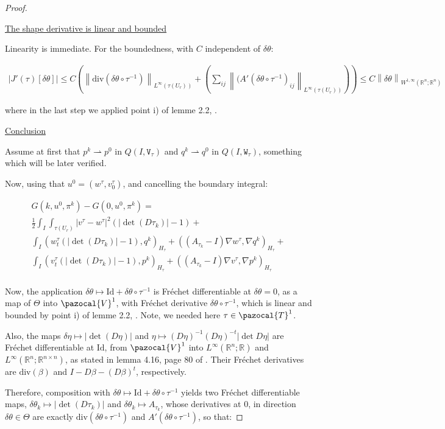 \documentclass[english,a4paper,9pt,oneside]{scrbook}	%
\theoremstyle{break}
\newenvironment{mproof}[1][\proofname]{%
  \begin{proof}[#1]$ $\par\nobreak\ignorespaces
}{%
  \end{proof}
}
\renewcommand*{\proofname}{Proof}
\theoremstyle{remark}
\newcommand{\mR}{\mathbb{R}}
\newcommand{\cV}{\pazocal{V}}
\newcommand{\norm}[1]{\left\lVert#1\right\rVert}
\newcommand{\cT}{\pazocal{T}}
\newcommand{\id}{\text{Id}}
\newcommand{\te}{\theta}
\newcommand{\Te}{\Theta}
\newcommand{\dive}{\text{div}}
\newcommand{\weakc}{\rightharpoonup}
\newcommand{\tw}[1]{\texttt{#1}}
\begin{document}
\begin{mproof}

\underline{The shape derivative is linear and bounded}

Linearity is immediate. For the boundedness, with $C$ independent of $\delta \te$:

\begin{align*}
|J'(\tau)[\delta \te]| \leq C \left ( \norm{\dive(\delta \te\circ  \tau^{-1})}_{L^\infty(\tau(U_r))}+\left(\sum_{ij} \norm{(A'(\delta\te \circ \tau^{-1})_{ij}}_{L^\infty(\tau(U_r))}\right )\right )\leq
C\norm{\delta \te }_{W^{1,\infty}(\mR^n;\mR^n)}
\end{align*}

where in the last step we applied point i) of lemme 2.2, \cite{murat}. 

\underline{Conclusion}

Assume at first that $p^k \weakc p^0$ in $Q(I,\tw{V}_\tau)$ and $q^k \weakc q^0$ in $Q(I,\tw{W}_\tau)$, something which will be later verified.

Now, using that $u^0=(w^\tau, v_0^\tau)$, and cancelling the boundary integral:

\begin{align*}
G(k,u^0,\pi^k)-G(0,u^0,\pi^k) =\\
\frac{1}{2}\int_I \int_{\tau(U_r)}|v^\tau-w^\tau|^2(|\det(D\tau_k)|-1)+\\
\int_I ( w_t^\tau (|\det(D\tau_k)| -1), q^k)_{H_\tau}+ ((A_{\tau_k}-I)\nabla w^\tau, \nabla q^k)_{H_\tau}+\\
\int_I (v_t^\tau (|\det(D\tau_k)|-1),p^k )_{H_\tau} + ((A_{\tau_k}-I) \nabla v^\tau, \nabla p^k)_{H_\tau} \\
\end{align*}

Now, the application $\delta \te \mapsto \id +\delta \te \circ \tau^{-1}$ is Fréchet differentiable at $\delta \te =0$, as a map of $\Te$ into $\cV^1$, with Fréchet derivative $\delta \te \circ \tau^{-1}$, which is linear and bounded by point i) of lemme 2.2, \cite{murat}. Note, we needed here $\tau \in \cT^1$.

Also, the maps $\delta \eta \mapsto |\det(D\eta)|$ and $\eta\mapsto (D\eta)^{-1}(D\eta)^{-t}|\det D\eta|$ are Fréchet differentiable at $\id$, from $\cV^1$ into $L^\infty(\mR^n;\mR)$ and $L^\infty(\mR^n;\mR^{n\times n})$, as stated in lemma 4.16, page 80 of \cite{lindemann}. Their Fréchet derivatives are $\dive (\beta)$ and $I-D\beta-(D\beta)^t$, respectively.

Therefore, composition with  $\delta \te  \mapsto \id+ \delta \te \circ \tau^{-1}$ yields two Fréchet differentiable maps, $\delta \te_k \mapsto |\det(D\tau_k)|$ and $\delta \te_k \mapsto A_{\tau_k}$, whose derivatives at $0$, in direction $\delta \te \in \Te$ are exactly $\dive(\delta \te \circ \tau^{-1})$ and $A'(\delta \te \circ \tau^{-1})$, so that:


\end{mproof}
\end{document}
